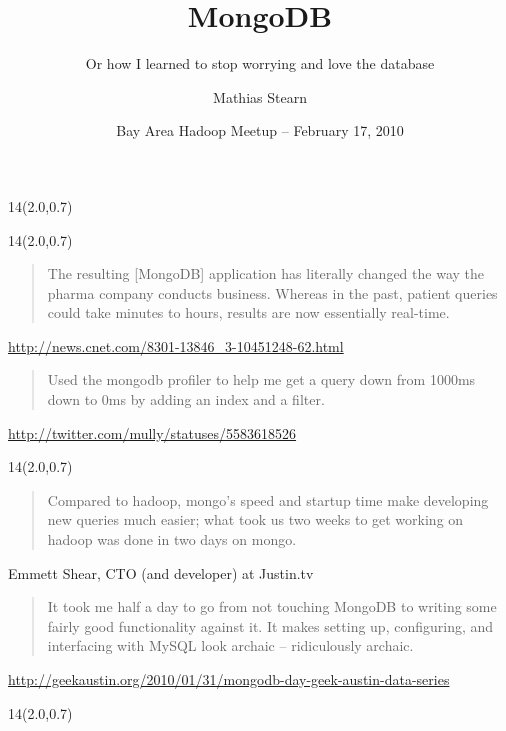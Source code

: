\documentclass{beamer}
\title{MongoDB}
\subtitle{Or how I learned to stop worrying and love the database}
\author{Mathias Stearn}
\institute{10gen}
\date{Bay Area Hadoop Meetup -- February 17, 2010}
\newcommand{\MongoLogo}{
\begin{textblock}{14}(2.0,0.7)
  \pgfuseimage{logo}
\end{textblock}
}
\begin{document}
\begin{frame}
  \MongoLogo
  \titlepage
\end{frame}

\begin{frame}
  \MongoLogo

  \begin{quote}
    The resulting [MongoDB] application has literally changed the way the
    pharma company conducts business. Whereas in the past, patient queries
    could take minutes to hours, results are now essentially real-time.
  \end{quote}
  \small \url{http://news.cnet.com/8301-13846_3-10451248-62.html}

  \begin{quote}
    Used the mongodb profiler to help me get a query down from 1000ms down to
    0ms by adding an index and a filter.
  \end{quote}
  \small \url{http://twitter.com/mully/statuses/5583618526}
\end{frame}

\begin{frame}
  \MongoLogo

  \begin{quote}
    Compared to hadoop, mongo's speed and startup time make developing new
    queries much easier; what took us two weeks to get working on hadoop was
    done in two days on mongo.
  \end{quote}
  \small Emmett Shear, CTO (and developer) at Justin.tv

  \begin{quote}
    It took me half a day to go from not touching MongoDB to writing some
    fairly good functionality against it. It makes setting up, configuring, and
    interfacing with MySQL look archaic -- ridiculously archaic.
  \end{quote}
  \small \url{http://geekaustin.org/2010/01/31/mongodb-day-geek-austin-data-series}
\end{frame}

\begin{frame}
  \MongoLogo
  \begin{center}
  \end{center}
\end{frame}
\end{document}

